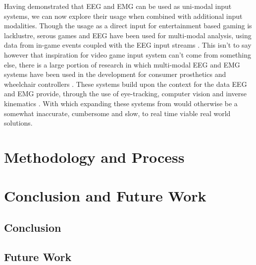 \documentclass[11pt, a4paper]{article}
\begin{document}
\hfill

Having demonstrated that EEG and EMG can be used as uni-modal input systems, we can now explore their usage when combined with additional input modalities. Though the usage as a direct input for entertainment based gaming is lacklustre, serous games and EEG have been used for multi-modal analysis, using data from in-game events coupled with the EEG input streams \cite{sivanathan2014temporal}. This isn't to say however that inspiration for video game input system can't come from something else, there is a large portion of research in which multi-modal EEG and EMG systems have been used in the development for consumer prosthetics \cite{shi2019novel} and wheelchair controllers \cite{carlson2013brain}. These systems build upon the context for the data EEG and EMG provide, through the use of eye-tracking, computer vision and inverse kinematics \cite{mcmullen2013demonstration}. With which expanding these systems from would otherwise be a somewhat inaccurate, cumbersome and slow, to real time viable real world solutions. 



\pagebreak
\section{Methodology and Process}			%





\pagebreak
\section{Conclusion and Future Work}

\subsection{Conclusion}

\subsection{Future Work}			%




\pagebreak


\end{document}
